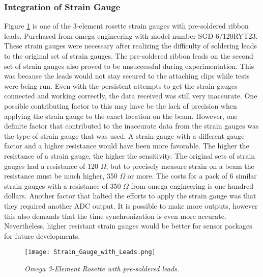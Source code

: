 \subsubsection{Integration of Strain Gauge}

\indent Figure \ref{fig:OmegaSoldered} is one of the 3-element rosette strain gauges with pre-soldered ribbon leads. Purchased from omega engineering with
model number SGD-6/120RYT23. These strain gauges were necessary after realizing the difficulty of soldering leads to the original set of strain gauges. The
pre-soldered ribbon leads on the second set of strain gauges also proved to be unsuccessful during experimentation. This was because the leads would not
stay secured to the attaching clips while tests were being run. Even with the persistent attempts to get the strain gauges connected and working
correctly, the data received was still very inaccurate. One possible contributing factor to this may have be the lack of precision when applying the
strain gauge to the exact location on the beam. However, one definite factor that contributed to the inaccurate data from the strain gauges was the
type of strain gauge that was used. A strain gauge with a different gauge factor and a higher resistance would have been more favorable. The higher
the resistance of a strain gauge, the higher the sensitivity. The original sets of strain gauges had a resistance of 120 $\Omega$, but to precisely
measure strain on a beam the resistance must be much higher, 350 $\Omega$ or more. The costs for a pack of 6 similar strain gauges with a resistance of
350 $\Omega$ from omega engineering is one hundred dollars. Another factor that halted the efforts to apply the strain gauge was that they required
another ADC output. It is possible to make more outputs, however this also demands that the time synchronization is even more accurate.
Nevertheless, higher resistant strain gauges would be better for sensor packages for future developments. \\

\begin{figure}[h]
\centering
\texttt{[image: Strain\_Gauge\_with\_Leads.png]}
\caption{\textit{Omega 3-Element Rosette with pre-soldered leads.}}
\label{fig:OmegaSoldered}
\end{figure}